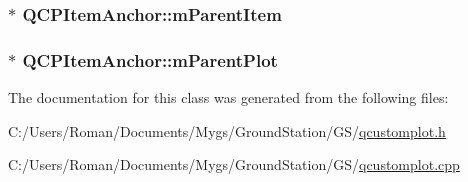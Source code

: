 \subsubsection[{m\+Parent\+Item}]{$\ast$ Q\+C\+P\+Item\+Anchor\+::m\+Parent\+Item\hspace{0.3cm}{\ttfamily [protected]}}\label{class_q_c_p_item_anchor_a80fad480ad3bb980446ed6ebc00818ae}
\hypertarget{class_q_c_p_item_anchor_a59b968410831ba91a25cc75a77dde6f5}{}
\subsubsection[{m\+Parent\+Plot}]{$\ast$ Q\+C\+P\+Item\+Anchor\+::m\+Parent\+Plot\hspace{0.3cm}{\ttfamily [protected]}}\label{class_q_c_p_item_anchor_a59b968410831ba91a25cc75a77dde6f5}


The documentation for this class was generated from the following files\+:\begin{DoxyCompactItemize}
\item 
C\+:/\+Users/\+Roman/\+Documents/\+Mygs/\+Ground\+Station/\+G\+S/\hyperlink{qcustomplot_8h}{qcustomplot.\+h}\item 
C\+:/\+Users/\+Roman/\+Documents/\+Mygs/\+Ground\+Station/\+G\+S/\hyperlink{qcustomplot_8cpp}{qcustomplot.\+cpp}\end{DoxyCompactItemize}
